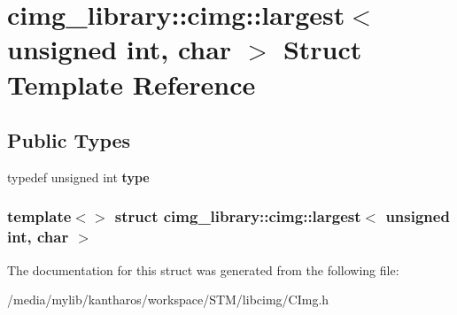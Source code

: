 \hypertarget{structcimg__library_1_1cimg_1_1largest_3_01unsigned_01int_00_01char_01_4}{
\section{cimg\_\-library::cimg::largest$<$ unsigned int, char $>$ Struct Template Reference}
\label{structcimg__library_1_1cimg_1_1largest_3_01unsigned_01int_00_01char_01_4}
}
\subsection*{Public Types}
\begin{DoxyCompactItemize}
\item 
\hypertarget{structcimg__library_1_1cimg_1_1largest_3_01unsigned_01int_00_01char_01_4_a2d9829c2c0b16ca22f704732afc657bd}{
typedef unsigned int {\bfseries type}}
\label{structcimg__library_1_1cimg_1_1largest_3_01unsigned_01int_00_01char_01_4_a2d9829c2c0b16ca22f704732afc657bd}

\end{DoxyCompactItemize}
\subsubsection*{template$<$$>$ struct cimg\_\-library::cimg::largest$<$ unsigned int, char $>$}



The documentation for this struct was generated from the following file:\begin{DoxyCompactItemize}
\item 
/media/mylib/kantharos/workspace/STM/libcimg/CImg.h\end{DoxyCompactItemize}
